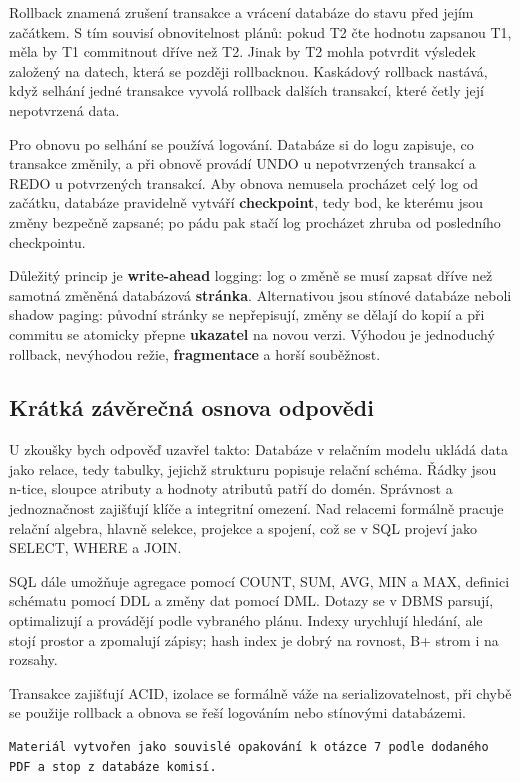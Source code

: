 \documentclass[11pt,a4paper]{article}
\begin{document}
Rollback znamená zrušení transakce a vrácení databáze do stavu před jejím začátkem. S tím souvisí obnovitelnost plánů: pokud T2 čte hodnotu zapsanou T1, měla by T1 commitnout dříve než T2. Jinak by T2 mohla potvrdit výsledek založený na datech, která se později rollbacknou. Kaskádový rollback nastává, když selhání jedné transakce vyvolá rollback dalších transakcí, které četly její nepotvrzená data.

Pro obnovu po selhání se používá logování. Databáze si do logu zapisuje, co transakce změnily, a při obnově provádí UNDO u nepotvrzených transakcí a REDO u potvrzených transakcí. Aby obnova nemusela procházet celý log od začátku, databáze pravidelně vytváří \textbf{checkpoint}, tedy bod, ke kterému jsou změny bezpečně zapsané; po pádu pak stačí log procházet zhruba od posledního checkpointu.

Důležitý princip je \textbf{write-ahead} logging: log o změně se musí zapsat dříve než samotná změněná databázová \textbf{stránka}. Alternativou jsou stínové databáze neboli shadow paging: původní stránky se nepřepisují, změny se dělají do kopií a při commitu se atomicky přepne \textbf{ukazatel} na novou verzi. Výhodou je jednoduchý rollback, nevýhodou režie, \textbf{fragmentace} a horší souběžnost.

\subsection*{Krátká závěrečná osnova odpovědi}

U zkoušky bych odpověď uzavřel takto: Databáze v relačním modelu ukládá data jako relace, tedy tabulky, jejichž strukturu popisuje relační schéma. Řádky jsou n-tice, sloupce atributy a hodnoty atributů patří do domén. Správnost a jednoznačnost zajišťují klíče a integritní omezení. Nad relacemi formálně pracuje relační algebra, hlavně selekce, projekce a spojení, což se v SQL projeví jako SELECT, WHERE a JOIN.

SQL dále umožňuje agregace pomocí COUNT, SUM, AVG, MIN a MAX, definici schématu pomocí DDL a změny dat pomocí DML. Dotazy se v DBMS parsují, optimalizují a provádějí podle vybraného plánu. Indexy urychlují hledání, ale stojí prostor a zpomalují zápisy; hash index je dobrý na rovnost, B+ strom i na rozsahy.

Transakce zajišťují ACID, izolace se formálně váže na serializovatelnost, při chybě se použije rollback a obnova se řeší logováním nebo stínovými databázemi.

\begin{codebox}
\small
\begin{verbatim}
Materiál vytvořen jako souvislé opakování k otázce 7 podle dodaného PDF a stop z databáze komisí.
\end{verbatim}
\end{codebox}
\end{document}

